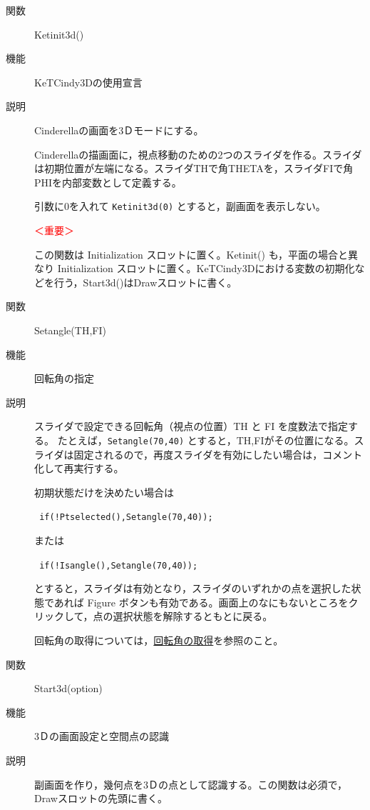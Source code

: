 \documentclass[papersize,a4paper,12pt,uplatex]{jsarticle}
\begin{document}
\begin{description}

\hypertarget{ketinit3d}{}
\item[関数]Ketinit3d()
\item[機能]KeTCindy3Dの使用宣言
\item[説明]Cinderellaの画面を3Ｄモードにする。

Cinderellaの描画面に，視点移動のための2つのスライダを作る。スライダは初期位置が左端になる。スライダTHで角THETAを，スライダFIで角PHIを内部変数として定義する。

引数に0を入れて \verb|Ketinit3d(0)| とすると，副画面を表示しない。

\textcolor{red}{＜重要＞}

この関数は Initialization スロットに置く。Ketinit() も，平面の場合と異なり Initialization スロットに置く。KeTCindy3Dにおける変数の初期化などを行う，Start3d()はDrawスロットに書く。

\vspace{\baselineskip}
\hypertarget{setangle}{}
\item[関数]Setangle(TH,FI)
\item[機能]回転角の指定
\item[説明]スライダで設定できる回転角（視点の位置）TH と FI を度数法で指定する。
たとえば，\verb|Setangle(70,40)| とすると，TH,FIがその位置になる。スライダは固定されるので，再度スライダを有効にしたい場合は，コメント化して再実行する。

初期状態だけを決めたい場合は

\verb| if(!Ptselected(),Setangle(70,40)); | 

または

\verb| if(!Isangle(),Setangle(70,40)); | 

とすると，スライダは有効となり，スライダのいずれかの点を選択した状態であれば Figure ボタンも有効である。画面上のなにもないところをクリックして，点の選択状態を解除するともとに戻る。

回転角の取得については，\hyperlink{getangle}{回転角の取得}を参照のこと。

\vspace{\baselineskip}
\hypertarget{start3d}{}
\item[関数]Start3d(option)
\item[機能]3Ｄの画面設定と空間点の認識
\item[説明]副画面を作り，幾何点を3Ｄの点として認識する。この関数は必須で，Drawスロットの先頭に書く。


\end{description}
\end{document}
